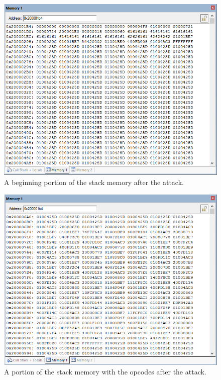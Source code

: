 \documentclass[letterpaper, 10 pt, conference]{ieeeconf}  %
\begin{document}
\begin{figure}[thpb]
	\centering
	\includegraphics[scale=.5]{Stack_After1}
    \caption{A beginning portion of the stack memory after the attack.}
\end{figure}

\begin{figure}[thpb]
	\centering
	\includegraphics[scale=.5]{Stack_After2}
    \caption{A portion of the stack memory with the opcodes after the attack.}
\end{figure}
\end{document}
